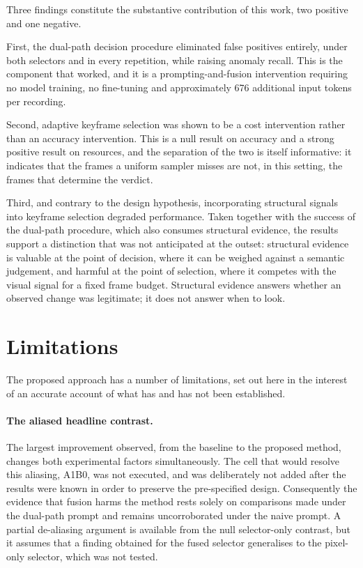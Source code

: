 Three findings constitute the substantive contribution of this work, two
positive and one negative.

First, the dual-path decision procedure eliminated false positives
entirely, under both selectors and in every repetition, while raising
anomaly recall. This is the component that worked, and it is a
prompting-and-fusion intervention requiring no model training, no
fine-tuning and approximately 676 additional input tokens per recording.

Second, adaptive keyframe selection was shown to be a cost intervention
rather than an accuracy intervention. This is a null result on accuracy
and a strong positive result on resources, and the separation of the two
is itself informative: it indicates that the frames a uniform sampler
misses are not, in this setting, the frames that determine the verdict.

Third, and contrary to the design hypothesis, incorporating structural
signals into keyframe selection degraded performance. Taken together with
the success of the dual-path procedure, which also consumes structural
evidence, the results support a distinction that was not anticipated at
the outset: structural evidence is valuable at the point of decision,
where it can be weighed against a semantic judgement, and harmful at the
point of selection, where it competes with the visual signal for a fixed
frame budget. Structural evidence answers whether an observed change was
legitimate; it does not answer when to look.


\section{Limitations}
\label{sec:limitations}

The proposed approach has a number of limitations, set out here in the
interest of an accurate account of what has and has not been established.

\paragraph{The aliased headline contrast.}
The largest improvement observed, from the baseline to the proposed
method, changes both experimental factors simultaneously. The cell that
would resolve this aliasing, A1B0, was not executed, and was deliberately
not added after the results were known in order to preserve the
pre-specified design. Consequently the evidence that fusion harms the
method rests solely on comparisons made under the dual-path prompt and
remains uncorroborated under the naive prompt. A partial de-aliasing
argument is available from the null selector-only contrast, but it assumes
that a finding obtained for the fused selector generalises to the
pixel-only selector, which was not tested.

